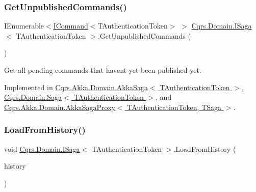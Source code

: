 \mbox{\label{interfaceCqrs_1_1Domain_1_1ISaga_abba76d72857107a14328c8b555f3883f_abba76d72857107a14328c8b555f3883f}} 
\subsubsection{\texorpdfstring{Get\+Unpublished\+Commands()}{GetUnpublishedCommands()}}
{\footnotesize\ttfamily I\+Enumerable$<$\hyperlink{interfaceCqrs_1_1Commands_1_1ICommand}{I\+Command}$<$T\+Authentication\+Token$>$ $>$ \hyperlink{interfaceCqrs_1_1Domain_1_1ISaga}{Cqrs.\+Domain.\+I\+Saga}$<$ T\+Authentication\+Token $>$.Get\+Unpublished\+Commands (\begin{DoxyParamCaption}{ }\end{DoxyParamCaption})}



Get all pending commands that haven\textquotesingle{}t yet been published yet. 



Implemented in \hyperlink{classCqrs_1_1Akka_1_1Domain_1_1AkkaSaga_a0776a9a8f387c01313aa12d06643249a_a0776a9a8f387c01313aa12d06643249a}{Cqrs.\+Akka.\+Domain.\+Akka\+Saga$<$ T\+Authentication\+Token $>$}, \hyperlink{classCqrs_1_1Domain_1_1Saga_ac21a95f722235e90ea721542bed24148_ac21a95f722235e90ea721542bed24148}{Cqrs.\+Domain.\+Saga$<$ T\+Authentication\+Token $>$}, and \hyperlink{classCqrs_1_1Akka_1_1Domain_1_1AkkaSagaProxy_a959a64faad2d1a8f912c08362adab668_a959a64faad2d1a8f912c08362adab668}{Cqrs.\+Akka.\+Domain.\+Akka\+Saga\+Proxy$<$ T\+Authentication\+Token, T\+Saga $>$}.

\mbox{\label{interfaceCqrs_1_1Domain_1_1ISaga_a2714804684bc65cf4dec79b4697b9b21_a2714804684bc65cf4dec79b4697b9b21}} 
\subsubsection{\texorpdfstring{Load\+From\+History()}{LoadFromHistory()}}
{\footnotesize\ttfamily void \hyperlink{interfaceCqrs_1_1Domain_1_1ISaga}{Cqrs.\+Domain.\+I\+Saga}$<$ T\+Authentication\+Token $>$.Load\+From\+History (\begin{DoxyParamCaption}\item[{I\+Enumerable$<$ \hyperlink{interfaceCqrs_1_1Events_1_1ISagaEvent}{I\+Saga\+Event}$<$ T\+Authentication\+Token $>$$>$}]{history }\end{DoxyParamCaption})}




